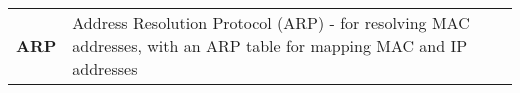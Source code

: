 \setcounter{page}{6}

\def\arraystretch{1.5}
\begin{table}[H]
    \centering
    \begin{tabular}{ p{4cm}  p{12cm} } 
        \textbf{ARP} & Address Resolution Protocol (ARP) - for resolving MAC addresses, with an ARP table for mapping MAC and IP addresses \\ 
    \end{tabular}
\end{table}

